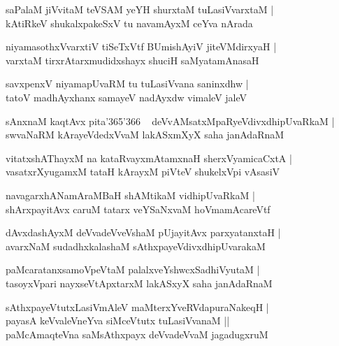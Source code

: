 \documentclass[twoside,12pt,openright]{book}
\newcounter{shloka}[chapter]
\begin{document}
\begin{shloka}%
saPalaM jiVvitaM teVSAM yeYH shurxtaM tuLasiVvarxtaM |\\ 
kAtiRkeV shukalxpakeSxV tu navamAyxM ceYva nArada 
\end{shloka}

\begin{shloka}%
niyamasothxVvarxtiV tiSeTxVtf BUmishAyiV jiteVMdirxyaH |\\
varxtaM tirxrAtarxmudidxshayx shuciH saMyatamAnasaH 
\end{shloka}

\begin{shloka}%
savxpenxV niyamapUvaRM tu tuLasiVvana saninxdhw |\\
tatoV madhAyxhanx samayeV nadAyxdw vimaleV jaleV 
\end{shloka}

\begin{shloka}%
sAnxnaM kaqtAvx pita\char'365\char'366 ~ deVvAMsatxMpaRyeVdivxdhipUvaRkaM |\\
swvaNaRM kArayeVdedxVvaM lakASxmXyX saha janAdaRnaM
\end{shloka}

\begin{shloka}%
vitatxshAThayxM na kataRvayxmAtamxnaH sherxVyamicaCxtA |\\
vasatxrXyugamxM tataH kArayxM piVteV shukelxVpi vAsasiV
\end{shloka}

\begin{shloka}%
navagarxhANamAraMBaH shAMtikaM vidhipUvaRkaM |\\
shArxpayitAvx caruM tatarx veYSaNxvaM hoVmamAcareVtf
\end{shloka}

\begin{shloka}%
dAvxdashAyxM deVvadeVveVshaM pUjayitAvx parxyatanxtaH |\\
avarxNaM sudadhxkalashaM sAthxpayeVdivxdhipUvarakaM 
\end{shloka}

\begin{shloka}%
paMcaratanxsamoVpeVtaM palalxveYshwcxSadhiVyutaM |\\
tasoyxVpari nayxseVtApxtarxM lakASxyX saha janAdaRnaM
\end{shloka}

\begin{shloka}%
sAthxpayeVtutxLasiVmAleV maMterxYveRVdapuraNakeqH |\\
payasA keVvaleVneYva siMceVtutx tuLasiVvanaM ||\\
paMcAmaqteVna saMsAthxpayx deVvadeVvaM jagadugxruM
\end{shloka}
\end{document}
